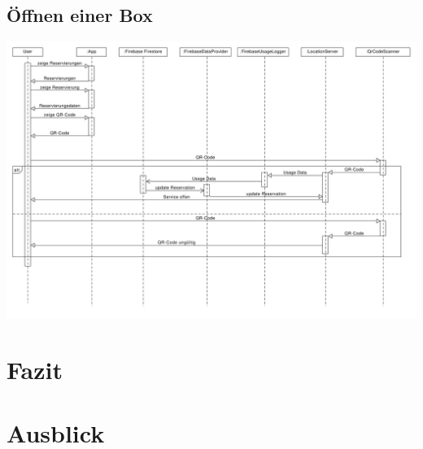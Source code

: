 \documentclass[openright,twoside,a4paper]{scrartcl}
\begin{document}
                    \subsection{Öffnen einer Box}
                        \includegraphics[scale=0.32]{Bilder/Open_Reservation_Sequence_15112019.pdf}


    \section{Fazit}

    \section{Ausblick}
    
    
    
\end{document}
